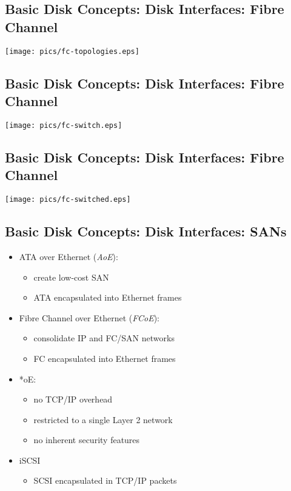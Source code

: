 \documentclass[xga]{xdvislides}
\begin{document}
\subsection{Basic Disk Concepts: Disk Interfaces: Fibre Channel}
\vfill
	\begin{center}
		\texttt{[image: pics/fc-topologies.eps]} \\
	\end{center}
\vfill

\subsection{Basic Disk Concepts: Disk Interfaces: Fibre Channel}
\vfill
	\begin{center}
		\texttt{[image: pics/fc-switch.eps]} \\
	\end{center}
\vfill

\subsection{Basic Disk Concepts: Disk Interfaces: Fibre Channel}
\vfill
	\begin{center}
		\texttt{[image: pics/fc-switched.eps]} \\
	\end{center}
\vfill

\subsection{Basic Disk Concepts: Disk Interfaces: SANs}
\begin{itemize}
	\item ATA over Ethernet ({\em AoE}):
		\begin{itemize}
			\item create low-cost SAN
			\item ATA encapsulated into Ethernet frames
		\end{itemize}
	\item Fibre Channel over Ethernet ({\em FCoE}):
		\begin{itemize}
			\item consolidate IP and FC/SAN networks
			\item FC encapsulated into Ethernet frames
		\end{itemize}

	\item *oE:
		\begin{itemize}
			\item no TCP/IP overhead
			\item restricted to a single Layer 2 network
			\item no inherent security features
		\end{itemize}
	\item iSCSI
		\begin{itemize}
			\item SCSI encapsulated in TCP/IP packets
		\end{itemize}
\end{itemize}
\end{document}
